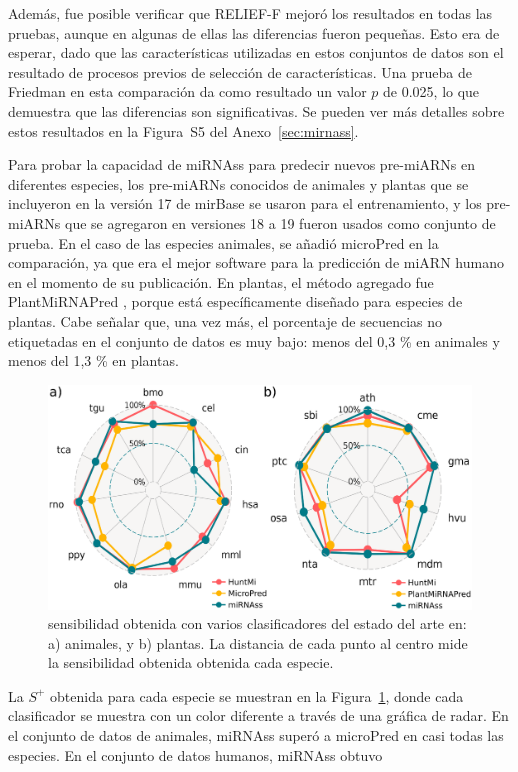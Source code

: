 Además, fue posible verificar que RELIEF-F mejoró los resultados en todas las pruebas, aunque en algunas de ellas las diferencias fueron pequeñas. Esto era
de esperar, dado que las características utilizadas en estos conjuntos de datos son el resultado de procesos previos de selección de características. Una
prueba de Friedman en esta comparación da como resultado un valor $ p $ de 0.025, lo que demuestra que las diferencias son significativas. Se pueden ver más
detalles sobre estos resultados en la Figura~S5 del Anexo~\ref{sec:mirnass}.

Para probar la capacidad de miRNAss para predecir nuevos pre-miARNs en diferentes especies, los pre-miARNs conocidos de animales y plantas que se incluyeron en
la versión 17 de mirBase se usaron para el entrenamiento, y los pre-miARNs que se agregaron en versiones 18 a 19 fueron usados como conjunto de prueba. En el caso de las especies
animales, se añadió microPred \citep{batuwita2009micropred} en la comparación, ya que era el mejor software para la predicción de miARN humano en el
momento de su publicación. En plantas, el método agregado fue PlantMiRNAPred \citep{xuan2011plantmirnapred}, porque está específicamente diseñado para
especies de plantas. Cabe señalar que, una vez más, el porcentaje de secuencias no etiquetadas en el conjunto de datos es muy bajo: menos del 0,3 \% en
animales y menos del 1,3 \% en plantas.
\begin{figure}[t]
	\centering
	\includegraphics[width=0.6\linewidth]{fig/delta_mirbase_radar.eps}
	\caption[Sensibilidad en animales y plantas]{sensibilidad obtenida con varios clasificadores del estado del arte en: a) animales, y b) plantas.
		La distancia de cada punto al centro mide la sensibilidad obtenida obtenida cada especie.}
	\label{fig:deltaRadar}
\end{figure}
La $S^{+}$ obtenida para cada especie se muestran en la Figura~\ref{fig:deltaRadar}, donde cada clasificador se muestra con un color diferente a través de una
gráfica de radar. En el conjunto de datos de animales, miRNAss superó a microPred en casi todas las especies. En el conjunto de datos humanos, miRNAss obtuvo
